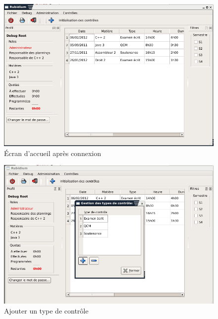 \begin{figure}[H]
	\begin{center}
		\includegraphics[width=15cm]{images/ihm_apresConnexion.png}
	\end{center}
	\caption{Écran d'accueil après connexion}
\end{figure}

\begin{figure}[H]
	\begin{center}
		\includegraphics[width=15cm]{images/ihm_ajoutTypeControle.png}
	\end{center}
	\caption{Ajouter un type de contrôle}
\end{figure}

